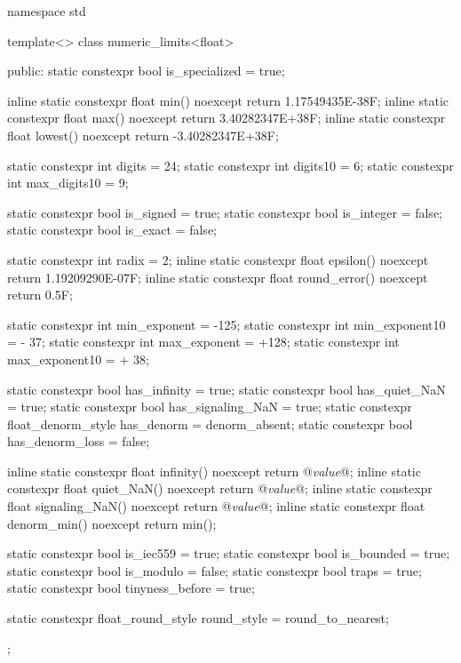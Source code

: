 \pnum
\begin{example}
\begin{codeblock}
namespace std {
  template<> class numeric_limits<float> {
  public:
    static constexpr bool is_specialized = true;

    inline static constexpr float min() noexcept { return 1.17549435E-38F; }
    inline static constexpr float max() noexcept { return 3.40282347E+38F; }
    inline static constexpr float lowest() noexcept { return -3.40282347E+38F; }

    static constexpr int digits   = 24;
    static constexpr int digits10 =  6;
    static constexpr int max_digits10 =  9;

    static constexpr bool is_signed  = true;
    static constexpr bool is_integer = false;
    static constexpr bool is_exact   = false;

    static constexpr int radix = 2;
    inline static constexpr float epsilon() noexcept     { return 1.19209290E-07F; }
    inline static constexpr float round_error() noexcept { return 0.5F; }

    static constexpr int min_exponent   = -125;
    static constexpr int min_exponent10 = - 37;
    static constexpr int max_exponent   = +128;
    static constexpr int max_exponent10 = + 38;

    static constexpr bool has_infinity             = true;
    static constexpr bool has_quiet_NaN            = true;
    static constexpr bool has_signaling_NaN        = true;
    static constexpr float_denorm_style has_denorm = denorm_absent;
    static constexpr bool has_denorm_loss          = false;

    inline static constexpr float infinity()      noexcept { return @\textit{value}@; }
    inline static constexpr float quiet_NaN()     noexcept { return @\textit{value}@; }
    inline static constexpr float signaling_NaN() noexcept { return @\textit{value}@; }
    inline static constexpr float denorm_min()    noexcept { return min(); }

    static constexpr bool is_iec559  = true;
    static constexpr bool is_bounded = true;
    static constexpr bool is_modulo  = false;
    static constexpr bool traps      = true;
    static constexpr bool tinyness_before = true;

    static constexpr float_round_style round_style = round_to_nearest;
  };
}
\end{codeblock}
\end{example}

